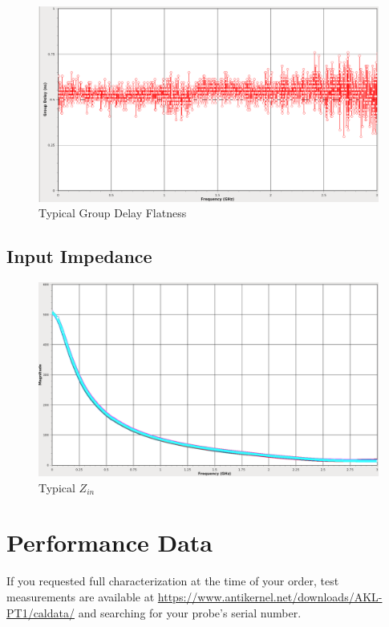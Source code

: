 \documentclass[11pt]{article}
\begin{document}
\begin{figure}[h]
\centering
\includegraphics[width=14cm]{typical-groupdelay.png}
\caption{Typical Group Delay Flatness}
\label{typical-groupdelay}
\end{figure}
\FloatBarrier

\subsection{Input Impedance}

\begin{figure}[h!]
\centering
\includegraphics[width=14cm]{typical-zin.png}
\caption{Typical $Z_{in}$}
\label{typical-zin}
\end{figure}

\FloatBarrier

\pagebreak
\section{Performance Data}

If you requested full characterization at the time of your order, test measurements are available at
\url{https://www.antikernel.net/downloads/AKL-PT1/caldata/} and searching for your probe's serial number.
\end{document}
